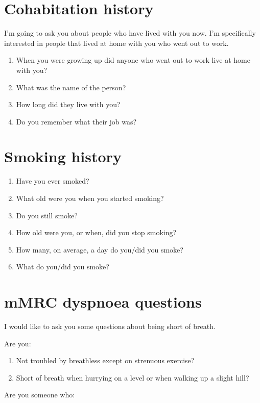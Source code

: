 \documentclass[a4paper,10pt]{article}
\begin{document}
\newpage

\section{Cohabitation history}
I'm going to ask you about people who have lived with you now. I'm specifically interested in people that lived at home with you who went out to work.

\begin{enumerate}
\item When you were growing up did anyone who went out to work live at home with you?
\item What was the name of the person?
\item How long did they live with you?
\item Do you remember what their job was?
\end{enumerate}


\section{Smoking history}

\begin{enumerate}
\item Have you ever smoked?
\item What old were you when you started smoking?
\item Do you still smoke?
\item How old were you, or when, did you stop smoking?
\item How many, on average, a day do you/did you smoke?
\item What do you/did you smoke?
\end{enumerate}

\section{mMRC dyspnoea questions} 

I would like to ask you some questions about being short of breath.

Are you:

\begin{enumerate}
\item Not troubled by breathless except on strenuous exercise?
\item Short of breath when hurrying on a level or when walking up a slight hill?
\end{enumerate}

Are you someone who:
\end{document}
